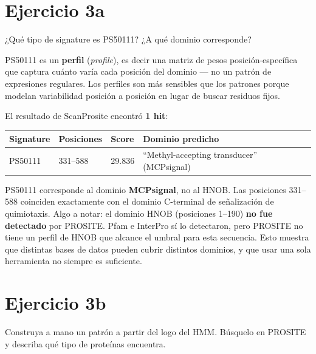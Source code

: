 
\section{Ejercicio 3a}

\begin{consigna}
¿Qué tipo de signature es PS50111? ¿A qué dominio corresponde?
\end{consigna}

PS50111 es un \textbf{perfil} (\textit{profile}), es decir una matriz de pesos posición-específica
que captura cuánto varía cada posición del dominio --- no un patrón de expresiones regulares. Los
perfiles son más sensibles que los patrones porque modelan variabilidad posición a posición en lugar
de buscar residuos fijos.

El resultado de ScanProsite encontró \textbf{1 hit}:

\begin{table}[H]
\centering
\footnotesize
\begin{tabular}{llP{2.5cm}P{5cm}}
\toprule
Signature & Posiciones & Score & Dominio predicho \\
\midrule
PS50111 & 331--588 & 29.836 & ``Methyl-accepting transducer'' (MCPsignal) \\
\bottomrule
\end{tabular}
\end{table}

PS50111 corresponde al dominio \textbf{MCPsignal}, no al HNOB. Las posiciones 331--588 coinciden
exactamente con el dominio C-terminal de señalización de quimiotaxis. Algo a notar: el dominio
HNOB (posiciones 1--190) \textbf{no fue detectado} por PROSITE. Pfam e InterPro sí lo detectaron,
pero PROSITE no tiene un perfil de HNOB que alcance el umbral para esta secuencia. Esto muestra
que distintas bases de datos pueden cubrir distintos dominios, y que usar una sola herramienta
no siempre es suficiente.

\section{Ejercicio 3b}

\begin{consigna}
Construya a mano un patrón a partir del logo del HMM. Búsquelo en PROSITE y describa qué tipo
de proteínas encuentra.
\end{consigna}

